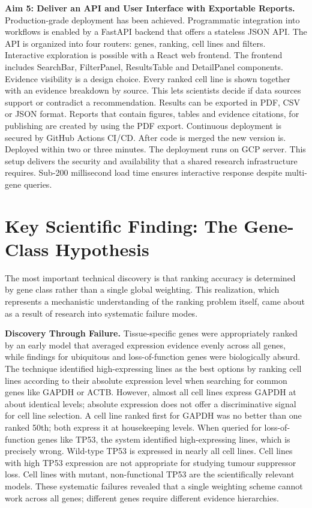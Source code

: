 \documentclass[author={Karen Coutinho, Ishaan Bhalla, Aman Raj, Dixit Kaloorani Malarmannan},
                supervisor={Dr. Daniel D'Andrea},
                degree={MSc},
                title={CellSelector Omics: A Multi-Omics Recommendation System for Cell Line Selection},
                subtitle={},
                type={},
                year={2026}]{dissertation}
\begin{document}
{\bf Aim 5: Deliver an API and User Interface with Exportable Reports.} Production‑grade deployment has been achieved. Programmatic integration into workflows is enabled by a FastAPI backend that offers a stateless JSON API. The API is organized into four routers: genes, ranking, cell lines and filters. Interactive exploration is possible with a React web frontend. The frontend includes SearchBar, FilterPanel, ResultsTable and DetailPanel components. Evidence visibility is a design choice. Every ranked cell line is shown together with an evidence breakdown by source. This lets scientists decide if data sources support or contradict a recommendation. Results can be exported in PDF, CSV or JSON format. Reports that contain figures, tables and evidence citations, for publishing are created by using the PDF export. Continuous deployment is secured by GitHub Actions CI/CD. After code is merged the new version is. Deployed within two or three minutes. The deployment runs on GCP server. This setup delivers the security and availability that a shared research infrastructure requires. Sub-200 millisecond load time ensures interactive response despite multi-gene queries.

\section{Key Scientific Finding: The Gene-Class Hypothesis}

The most important technical discovery is that ranking accuracy is determined by gene class rather than a single global weighting. This realization, which represents a mechanistic understanding of the ranking problem itself, came about as a result of research into systematic failure modes.

{\bf Discovery Through Failure.} Tissue-specific genes were appropriately ranked by an early model that averaged expression evidence evenly across all genes, while findings for ubiquitous and loss-of-function genes were biologically absurd. The technique identified high-expressing lines as the best options by ranking cell lines according to their absolute expression level when searching for common genes like GAPDH or ACTB. However, almost all cell lines express GAPDH at about identical levels; absolute expression does not offer a discriminative signal for cell line selection. A cell line ranked first for GAPDH was no better than one ranked 50th; both express it at housekeeping levels. When queried for loss-of-function genes like TP53, the system identified high-expressing lines, which is precisely wrong. Wild-type TP53 is expressed in nearly all cell lines. Cell lines with high TP53 expression are not appropriate for studying tumour suppressor loss. Cell lines with mutant, non-functional TP53 are the scientifically relevant models. These systematic failures revealed that a single weighting scheme cannot work across all genes; different genes require different evidence hierarchies.
\end{document}
